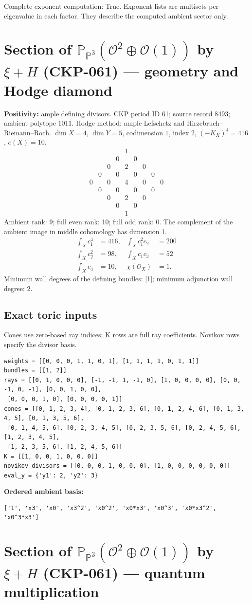 \documentclass[10pt,a4paper]{article}
\newcommand{\hodge}[4]{\begin{array}{ccccccccc}
&&&&1&&&&\\&&&0&&0&&&\\&&0&&#1&&0&&\\&0&&#2&&#2&&0&\\
0&&#3&&#4&&#3&&0\\&0&&#2&&#2&&0&\\&&0&&#1&&0&&\\&&&0&&0&&&\\&&&&1&&&&\end{array}}
\begin{document}
Complete exponent computation: True.
Exponent lists are multisets per eigenvalue in each factor. They describe the computed ambient sector only.
\clearpage\section*{Section of $\mathbb P_{\mathbb P^{3}}(\mathcal O^{2}\oplus \mathcal O(1))$ by $\xi +H$ (CKP-061) --- geometry and Hodge diamond}\label{entry:CKP-061}
\textbf{Positivity:} ample defining divisors.
CKP period ID 61; source record 8493; ambient polytope 1011.
Hodge method: ample Lefschetz and Hirzebruch--Riemann--Roch.
$\dim X=4$, $\dim Y=5$, codimension $1$, index $2$, $(-K_X)^4=416$, $e(X)=10$.
\[\hodge{2}{0}{0}{4}\]
Ambient rank: 9; full even rank: 10; full odd rank: 0. The complement of the ambient image in middle cohomology has dimension 1.
\[\begin{aligned}\int_Xc_1^4&=416,&\int_Xc_1^2c_2&=200\\\int_Xc_2^2&=98,&\int_Xc_1c_3&=52\\\int_Xc_4&=10,&\chi(\mathcal O_X)&=1.\end{aligned}\]
Minimum wall degrees of the defining bundles: [1]; minimum adjunction wall degree: 2.
\subsection*{Exact toric inputs}
Cones use zero-based ray indices; K rows are full ray coefficients. Novikov rows specify the divisor basis.

\begin{lstlisting}
weights = [[0, 0, 0, 1, 1, 0, 1], [1, 1, 1, 1, 0, 1, 1]]
bundles = [[1, 2]]
rays = [[0, 1, 0, 0, 0], [-1, -1, 1, -1, 0], [1, 0, 0, 0, 0], [0, 0, -1, 0, -1], [0, 0, 1, 0, 0],
 [0, 0, 0, 1, 0], [0, 0, 0, 0, 1]]
cones = [[0, 1, 2, 3, 4], [0, 1, 2, 3, 6], [0, 1, 2, 4, 6], [0, 1, 3, 4, 5], [0, 1, 3, 5, 6],
 [0, 1, 4, 5, 6], [0, 2, 3, 4, 5], [0, 2, 3, 5, 6], [0, 2, 4, 5, 6], [1, 2, 3, 4, 5],
 [1, 2, 3, 5, 6], [1, 2, 4, 5, 6]]
K = [[1, 0, 0, 1, 0, 0, 0]]
novikov_divisors = [[0, 0, 0, 1, 0, 0, 0], [1, 0, 0, 0, 0, 0, 0]]
eval_y = {'y1': 2, 'y2': 3}
\end{lstlisting}

\textbf{Ordered ambient basis:}
\begin{lstlisting}
['1', 'x3', 'x0', 'x3^2', 'x0^2', 'x0*x3', 'x0^3', 'x0*x3^2', 'x0^3*x3']
\end{lstlisting}

\clearpage\section*{Section of $\mathbb P_{\mathbb P^{3}}(\mathcal O^{2}\oplus \mathcal O(1))$ by $\xi +H$ (CKP-061) --- quantum multiplication}
\end{document}
